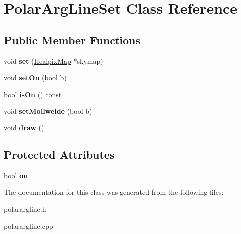 \hypertarget{classPolarArgLineSet}{
\section{PolarArgLineSet Class Reference}
\label{classPolarArgLineSet}
}
\subsection*{Public Member Functions}
\begin{DoxyCompactItemize}
\item 
\hypertarget{classPolarArgLineSet_a962c1bc5a61c4db825abb12d20599cc3}{
void {\bfseries set} (\hyperlink{classHealpixMap}{HealpixMap} $\ast$skymap)}
\label{classPolarArgLineSet_a962c1bc5a61c4db825abb12d20599cc3}

\item 
\hypertarget{classPolarArgLineSet_ac72df9dd3c420fd4d598260eaa1498db}{
void {\bfseries setOn} (bool b)}
\label{classPolarArgLineSet_ac72df9dd3c420fd4d598260eaa1498db}

\item 
\hypertarget{classPolarArgLineSet_ac385f3cf64377e3cbe3583d6381d8441}{
bool {\bfseries isOn} () const }
\label{classPolarArgLineSet_ac385f3cf64377e3cbe3583d6381d8441}

\item 
\hypertarget{classPolarArgLineSet_ac1f44b8e4cc43cdfc04c5346d2dee982}{
void {\bfseries setMollweide} (bool b)}
\label{classPolarArgLineSet_ac1f44b8e4cc43cdfc04c5346d2dee982}

\item 
\hypertarget{classPolarArgLineSet_a6f78c4a7fd433a8ba37691ec6cb412c3}{
void {\bfseries draw} ()}
\label{classPolarArgLineSet_a6f78c4a7fd433a8ba37691ec6cb412c3}

\end{DoxyCompactItemize}
\subsection*{Protected Attributes}
\begin{DoxyCompactItemize}
\item 
\hypertarget{classPolarArgLineSet_ab53b165d5e371a7f8c8a3f628c299fe2}{
bool {\bfseries on}}
\label{classPolarArgLineSet_ab53b165d5e371a7f8c8a3f628c299fe2}

\end{DoxyCompactItemize}


The documentation for this class was generated from the following files:\begin{DoxyCompactItemize}
\item 
polarargline.h\item 
polarargline.cpp\end{DoxyCompactItemize}
